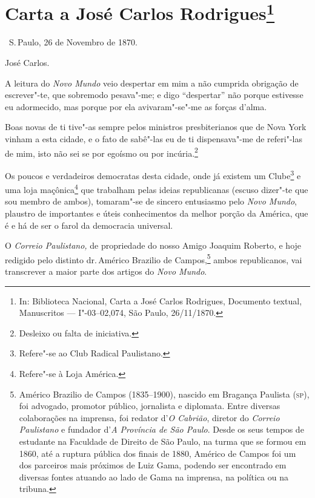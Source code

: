 \chapter{Carta a José Carlos Rodrigues\footnote[*]{In: Biblioteca
  Nacional, Carta a José Carlos Rodrigues, Documento textual,
  Manuscritos --- I"-03--02,074, São Paulo, 26/11/1870.}}


\hfill\ S.\,Paulo, 26 de Novembro de 1870.\medskip

\noindent{}José Carlos.\smallskip

A leitura do \emph{Novo Mundo} veio despertar em mim a não cumprida
obrigação de escrever"-te, que sobremodo pesava"-me; e digo ``despertar''
não porque estivesse eu adormecido, mas porque por ela avivaram"-se"-me as
forças d'alma.

Boas novas de ti tive"-as sempre pelos ministros presbiterianos que de
Nova York vinham a esta cidade, e o fato de sabê"-las eu de ti
dispensava"-me de referi"-las de mim, isto não sei se por egoísmo ou por
incúria.\footnote{Desleixo ou falta de iniciativa.}

Os poucos e verdadeiros democratas desta cidade, onde já existem um
Clube\footnote{Refere"-se ao Club Radical Paulistano.} e uma loja
maçônica\footnote{Refere"-se à Loja América.} que trabalham pelas
ideias republicanas (escuso dizer"-te que sou membro de ambos),
tomaram"-se de sincero entusiasmo pelo \emph{Novo Mundo}, plaustro de
importantes e úteis conhecimentos da melhor porção da América, que é e
há de ser o farol da democracia universal.

O \emph{Correio Paulistano,} de propriedade do nosso Amigo Joaquim
Roberto, e hoje redigido pelo distinto dr.\,Américo Brazilio de
Campos,\footnote{Américo Brazilio de Campos (1835--1900), nascido em
  Bragança Paulista (\textsc{sp}), foi advogado, promotor público, jornalista e
  diplomata. Entre diversas colaborações na imprensa, foi redator
  d'\emph{O Cabrião}, diretor do \emph{Correio Paulistano} e fundador
  d'\emph{A Província de São Paulo}. Desde os seus tempos de estudante
  na Faculdade de Direito de São Paulo, na turma que se formou em 1860,
  até a ruptura pública dos finais de 1880, Américo de Campos foi um dos
  parceiros mais próximos de Luiz Gama, podendo ser encontrado em
  diversas fontes atuando ao lado de Gama na imprensa, na política ou na
  tribuna.} ambos republicanos, vai transcrever a maior parte dos
artigos do \emph{Novo Mundo}.

